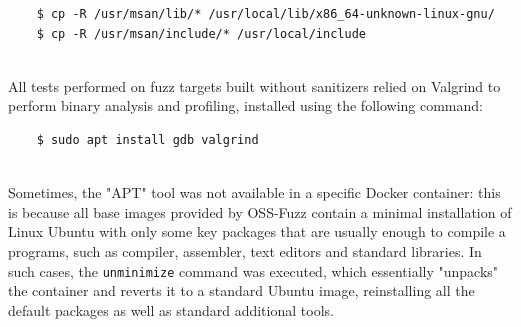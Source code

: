 \begin{verbatim}
    $ cp -R /usr/msan/lib/* /usr/local/lib/x86_64-unknown-linux-gnu/
    $ cp -R /usr/msan/include/* /usr/local/include
\end{verbatim}
\ \\
All tests performed on fuzz targets built without sanitizers relied on Valgrind to perform binary analysis and profiling, installed using the following command:\begin{verbatim}
    $ sudo apt install gdb valgrind
\end{verbatim}
\ \\
Sometimes, the "APT" tool was not available in a specific Docker container: this is because all base images provided by OSS-Fuzz contain a minimal installation of Linux Ubuntu with only some key packages that are usually enough to compile a programs, such as compiler, assembler, text editors and standard libraries.
\newline
In such cases, the \verb|unminimize| command was executed, which essentially "unpacks" the container and reverts it to a standard Ubuntu image, reinstalling all the default packages as well as standard additional tools.



